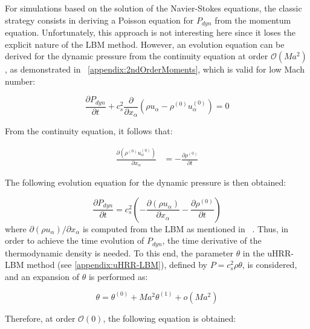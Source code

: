 

For simulations based on the solution of the Navier-Stokes equations, the
classic strategy consists in deriving a Poisson equation for $P_{dyn}$ from the
momentum equation. Unfortunately, this approach is not interesting here since it
loses the explicit nature of the LBM method. However, an evolution equation can
be derived for the dynamic pressure from the continuity equation at order
$\mathcal{O}(M\!a^2)$, as demonstrated in ~\ref{appendix:2ndOrderMoments}, which
is valid for low Mach number:

\begin{equation}
    \frac{\partial P_{dyn}}{\partial t} + c_s^2 \frac{\partial}{\partial x_{\alpha}}(\rho u_\alpha - \rho^{(0)} u_\alpha^{(0)}) = 0
\end{equation}

From the continuity equation, it follows that:

\begin{align}
    \frac{\partial (\rho^{(0)} u_\alpha^{(0)})}{\partial x_\alpha} &= -\frac{\partial \rho^{(0)}}{\partial t}
\end{align}

The following evolution equation for the dynamic pressure is then obtained:

\begin{equation}
    \frac{\partial P_{dyn}}{\partial t} = c_s^2( -\frac{\partial (\rho u_\alpha)}{\partial x_\alpha} - \frac{\partial \rho^{(0)}}{\partial t})
\end{equation}
where $\partial (\rho u_\alpha) / \partial x_\alpha$ is computed from the LBM as
mentioned in ~\cite{wissocq2022restoring}. Thus, in order to achieve the time
evolution  of $P_{dyn}$,  the time derivative of the thermodynamic density is
needed. To this end, the parameter \(\theta\) in the uHRR-LBM method (see
\ref{appendix:uHRR-LBM}), defined by \(P = c_s^2 \rho \theta\), is considered, and an
expansion of \(\theta\) is performed as:

\begin{equation}
    \theta = \theta^{(0)} + M\!a^2 \theta^{(1)} +o(M\!a^2)
\end{equation}

Therefore, at order \(\mathcal{O}(0)\), the following equation is obtained:

